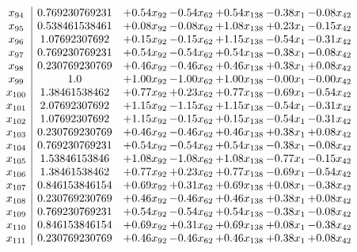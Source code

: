 \documentclass[8pt]{article}
\begin{document}
\[\begin{array}{c| c c@{\hskip 2pt} c@{\hskip 2pt} c@{\hskip 2pt} c@{\hskip 2pt} c@{\hskip 2pt} }
 x_{94}   &  0.769230769231 & +  0.54 x_{92} & -0.54 x_{62} & +  0.54 x_{138} & -0.38 x_{1} & -0.08 x_{42}\\
 x_{95}   &  0.538461538461 & +  0.08 x_{92} & -0.08 x_{62} & +  1.08 x_{138} & +  0.23 x_{1} & -0.15 x_{42}\\
 x_{96}   &  1.07692307692 & +  0.15 x_{92} & -0.15 x_{62} & +  1.15 x_{138} & -0.54 x_{1} & -0.31 x_{42}\\
 x_{97}   &  0.769230769231 & +  0.54 x_{92} & -0.54 x_{62} & +  0.54 x_{138} & -0.38 x_{1} & -0.08 x_{42}\\
 x_{98}   &  0.230769230769 & +  0.46 x_{92} & -0.46 x_{62} & +  0.46 x_{138} & +  0.38 x_{1} & +  0.08 x_{42}\\
 x_{99}   &  1.0 & +  1.00 x_{92} & -1.00 x_{62} & +  1.00 x_{138} & -0.00 x_{1} & -0.00 x_{42}\\
 x_{100}   &  1.38461538462 & +  0.77 x_{92} & +  0.23 x_{62} & +  0.77 x_{138} & -0.69 x_{1} & -0.54 x_{42}\\
 x_{101}   &  2.07692307692 & +  1.15 x_{92} & -1.15 x_{62} & +  1.15 x_{138} & -0.54 x_{1} & -0.31 x_{42}\\
 x_{102}   &  1.07692307692 & +  1.15 x_{92} & -0.15 x_{62} & +  0.15 x_{138} & -0.54 x_{1} & -0.31 x_{42}\\
 x_{103}   &  0.230769230769 & +  0.46 x_{92} & -0.46 x_{62} & +  0.46 x_{138} & +  0.38 x_{1} & +  0.08 x_{42}\\
 x_{104}   &  0.769230769231 & +  0.54 x_{92} & -0.54 x_{62} & +  0.54 x_{138} & -0.38 x_{1} & -0.08 x_{42}\\
 x_{105}   &  1.53846153846 & +  1.08 x_{92} & -1.08 x_{62} & +  1.08 x_{138} & -0.77 x_{1} & -0.15 x_{42}\\
 x_{106}   &  1.38461538462 & +  0.77 x_{92} & +  0.23 x_{62} & +  0.77 x_{138} & -0.69 x_{1} & -0.54 x_{42}\\
 x_{107}   &  0.846153846154 & +  0.69 x_{92} & +  0.31 x_{62} & +  0.69 x_{138} & +  0.08 x_{1} & -0.38 x_{42}\\
 x_{108}   &  0.230769230769 & +  0.46 x_{92} & -0.46 x_{62} & +  0.46 x_{138} & +  0.38 x_{1} & +  0.08 x_{42}\\
 x_{109}   &  0.769230769231 & +  0.54 x_{92} & -0.54 x_{62} & +  0.54 x_{138} & -0.38 x_{1} & -0.08 x_{42}\\
 x_{110}   &  0.846153846154 & +  0.69 x_{92} & +  0.31 x_{62} & +  0.69 x_{138} & +  0.08 x_{1} & -0.38 x_{42}\\
 x_{111}   &  0.230769230769 & +  0.46 x_{92} & -0.46 x_{62} & +  0.46 x_{138} & +  0.38 x_{1} & +  0.08 x_{42}\\

\end{array}\]
\end{document}
